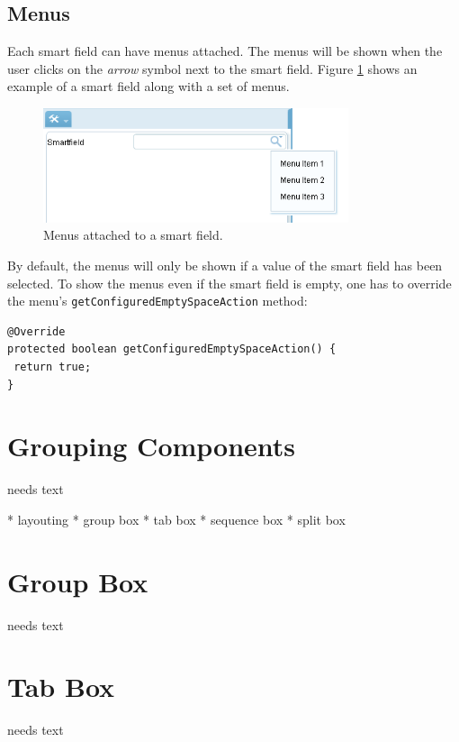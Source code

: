 \documentclass[a4paper,10pt,twoside]{book}
\begin{document}
\subsection{Menus}
Each smart field can have menus attached. The menus will be shown when the user clicks on the \emph{arrow} symbol next to the smart field. Figure \ref{fig:smartfield_menu} shows an example of a smart field along with a set of menus.
\begin{figure}[!htb]
\centering
\includegraphics[width=0.8\textwidth]{smartfieldmenu.png}
\caption{Menus attached to a smart field.}
\label{fig:smartfield_menu}
\end{figure}

By default, the menus will only be shown if a value of the smart field has been selected. To show the menus even if the smart field is empty, one has to override the menu's \lstinline$getConfiguredEmptySpaceAction$ method:

\begin{lstlisting}[backgroundcolor=\color{white}]
@Override
protected boolean getConfiguredEmptySpaceAction() {
 return true;
}
\end{lstlisting}
	
\section{Grouping Components}
needs text

* layouting
* group box
* tab box
* sequence box 
* split box

\section{Group Box}
needs text

\section{Tab Box}
needs text
\end{document}
